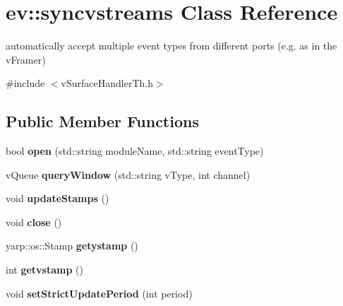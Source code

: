 \hypertarget{classev_1_1syncvstreams}{}\section{ev\+:\+:syncvstreams Class Reference}
\label{classev_1_1syncvstreams}


automatically accept multiple event types from different ports (e.\+g. as in the v\+Framer)  




{\ttfamily \#include $<$v\+Surface\+Handler\+Th.\+h$>$}

\subsection*{Public Member Functions}
\begin{DoxyCompactItemize}
\item 
\mbox{\label{classev_1_1syncvstreams_acc652540f64e92a0528e25932ff51d8f}} 
bool {\bfseries open} (std\+::string module\+Name, std\+::string event\+Type)
\item 
\mbox{\label{classev_1_1syncvstreams_a347bea90f23cf334667bb3e4b7bcf7a0}} 
v\+Queue {\bfseries query\+Window} (std\+::string v\+Type, int channel)
\item 
\mbox{\label{classev_1_1syncvstreams_a04f3e59f95d0749a6ceff9d7e426fb5d}} 
void {\bfseries update\+Stamps} ()
\item 
\mbox{\label{classev_1_1syncvstreams_ae4bdb73e97024c7399d8a105bdc8425a}} 
void {\bfseries close} ()
\item 
\mbox{\label{classev_1_1syncvstreams_a61e65f054ee803198d3e642df2bc1024}} 
yarp\+::os\+::\+Stamp {\bfseries getystamp} ()
\item 
\mbox{\label{classev_1_1syncvstreams_a8846f86bb2794a7b6117c4f9d9c9fa65}} 
int {\bfseries getvstamp} ()
\item 
\mbox{\label{classev_1_1syncvstreams_a83d0eb380a6a8eda16f35b45a7773da6}} 
void {\bfseries set\+Strict\+Update\+Period} (int period)
\item 

\end{DoxyCompactItemize}
